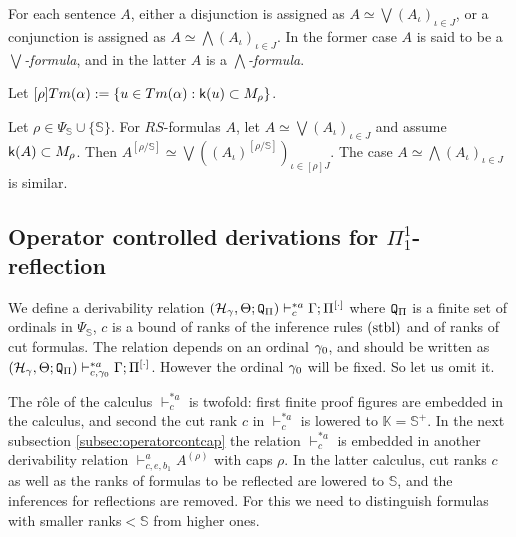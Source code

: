 \documentclass{article}
\newcommand{\mS}{\mathbb{S}}
\newcommand{\mK}{\mathbb{K}}
\begin{document}
For each sentence $A$, either a disjunction is assigned as $A\simeq\bigvee(A_{\iota})_{\iota\in J}$, or
a conjunction is assigned as $A\simeq\bigwedge(A_{\iota})_{\iota\in J}$.
In the former case $A$ is said to be a \textit{$\bigvee$-formula}, and in the latter
$A$ is a \textit{$\bigwedge$-formula}.



\bdf\label{df:assigndc}
{\rm
Let
$[\rho]Tm(\alpha):=\{u\in Tm(\alpha) : {\sf k}(u)\subset M_{\rho}\}$.

}
\edf



\bprp\label{lem:assigncollaps}
Let $\rho\in \Psi_{\mS}\cup\{\mathbb{S}\}$.
For $RS$-formulas $A$, let
$A\simeq \bigvee(A_{\iota})_{\iota\in J}$ and assume ${\sf k}(A)\subset M_{\rho}$.
Then
$A^{[\rho/\mathbb{S}]}\simeq \bigvee\left((A_{\iota})^{[\rho/\mathbb{S}]}\right)_{\iota\in [\rho]J}$.
The case $A\simeq \bigwedge(A_{\iota})_{\iota\in J}$ is similar.
\eprp







\subsection{Operator controlled derivations for $\Pi^{1}_{1}$-reflection}\label{subsec:operatorcontpi11}



We define a derivability relation 
$(\mathcal{H}_{\gamma},\Theta;{\tt Q}_{\Pi})\vdash^{* a}_{c}\Gamma;\Pi^{[\cdot]}$
where 
${\tt Q}_{\Pi}$ is a finite set of ordinals in $\Psi_{\mS}$,
$c$ is a bound of ranks of the inference rules $({\rm stbl})$ and of ranks of cut formulas.
The relation depends on an ordinal $\gamma_{0}$, and
should be written as $(\mathcal{H}_{\gamma},\Theta;{\tt Q}_{\Pi})\vdash^{*a}_{c,\gamma_{0}} \Gamma;\Pi^{[\cdot]}$.
However the ordinal $\gamma_{0}$ will be fixed.
So let us omit it.

The r\^{o}le of the calculus $\vdash^{* a}_{c}$ is twofold:
first finite proof figures are embedded in the calculus, and
second the cut rank $c$ in $\vdash^{* a}_{c}$ is lowered to $\mK=\mS^{+}$.
In the next subsection \ref{subsec:operatorcontcap} the relation $\vdash^{* a}_{c}$
is embedded in another derivability relation $\vdash^{a}_{c,e,b_{1}}A^{(\rho)}$ with caps $\rho$.
In the latter calculus, cut ranks $c$ as well as the ranks of formulas to be reflected
are lowered to $\mS$, and the inferences for reflections are removed.
For this we need to distinguish formulas with smaller ranks$<\mS$ from higher ones.
\end{document}
